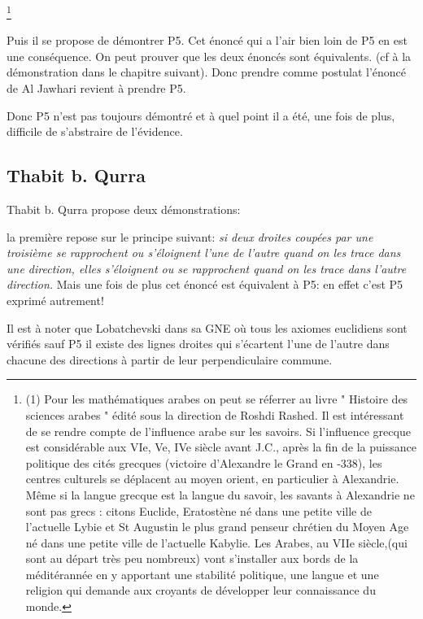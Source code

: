\documentclass[a4paper, 12pt, twoside]{book}
\begin{document}
  
 
   
  \footnote{ (1) Pour les mathématiques arabes on peut se réferrer au livre " Histoire des sciences arabes " édité sous la direction de Roshdi Rashed.
   Il est intéressant de se rendre compte de l'influence arabe sur les savoirs. Si l'influence grecque est considérable aux VIe, Ve, IVe siècle avant J.C., après la fin de la puissance politique des cités grecques (victoire d'Alexandre le Grand en -338), les centres culturels se déplacent au moyen orient, en particulier à Alexandrie. Même si la langue grecque est la langue du savoir, les savants à Alexandrie ne sont pas grecs : citons Euclide, Eratostène né dans une petite ville de l'actuelle Lybie et St Augustin le plus grand penseur chrétien du Moyen Age né dans une petite ville de l'actuelle Kabylie. Les Arabes, au VIIe siècle,(qui sont au départ très peu nombreux) vont s'installer aux bords de la méditérannée en y apportant une stabilité politique, une langue et une religion qui  demande aux croyants de développer leur connaissance du monde. } 
   
    Puis il se propose de démontrer P5. Cet énoncé qui a l'air bien loin de P5 en est une conséquence. On peut prouver que les deux énoncés sont équivalents. (cf à la démonstration dans le chapitre suivant). Donc prendre comme postulat l'énoncé de   Al Jawhari revient à prendre P5. \bigskip 
  
  
   
   Donc P5 n'est pas toujours démontré et à quel point il a été, une fois de plus, difficile de s'abstraire de l'évidence. 
   
    \subsection{Thabit b. Qurra}
   
   Thabit b. Qurra propose deux démonstrations:\bigskip 
   
   
    la première repose sur le principe suivant:\textit{ si deux droites coupées par une troisième se rapprochent ou s'éloignent l'une de l'autre quand on les trace dans une direction, elles s'éloignent ou se rapprochent quand on les trace dans l'autre direction.} Mais une fois de plus cet énoncé est équivalent à P5: en effet c'est P5 exprimé autrement!\bigskip 
    
    

   
   

 
   Il est à noter que Lobatchevski dans sa GNE où tous les axiomes euclidiens sont vérifiés sauf P5 il existe des lignes droites qui s'écartent l'une de l'autre dans chacune des directions à partir de leur perpendiculaire commune.\bigskip 
   
\end{document}
